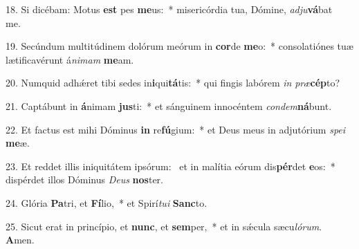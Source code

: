18. Si dicébam: Motus \textbf{est} pes \textbf{me}us:~*  misericórdia tua, Dómine, \textit{ad}\textit{ju}\textbf{vá}bat me.\

19. Secúndum multitúdinem dolórum meórum in \textbf{cor}de \textbf{me}o:~*  consolatiónes tuæ lætificavérunt á\textit{ni}\textit{mam} \textbf{me}am.\

20. Numquid adhǽret tibi sedes in\textbf{i}qui\textbf{tá}tis:~*  qui fingis labórem \textit{in} \textit{præ}\textbf{cép}to?\

21. Captábunt in \textbf{á}nimam \textbf{jus}ti:~*  et sánguinem innocéntem \textit{con}\textit{dem}\textbf{ná}bunt.\

22. Et factus est mihi Dóminus \textbf{in} re\textbf{fú}gium:~*  et Deus meus in adjutórium \textit{spe}\textit{i} \textbf{me}æ.\

23. Et reddet illis iniquitátem ipsórum: \dag\  et in malítia eórum dis\textbf{pér}det \textbf{e}os:~*  dispérdet illos Dóminus \textit{De}\textit{us} \textbf{nos}ter.\

24. Glória \textbf{Pa}tri, et \textbf{Fí}lio,~*  et Spirí\textit{tu}\textit{i} \textbf{Sanc}to.\

25. Sicut erat in princípio, et \textbf{nunc}, et \textbf{sem}per,~*  et in sǽcula sæcu\textit{ló}\textit{rum}. \textbf{A}men.\

